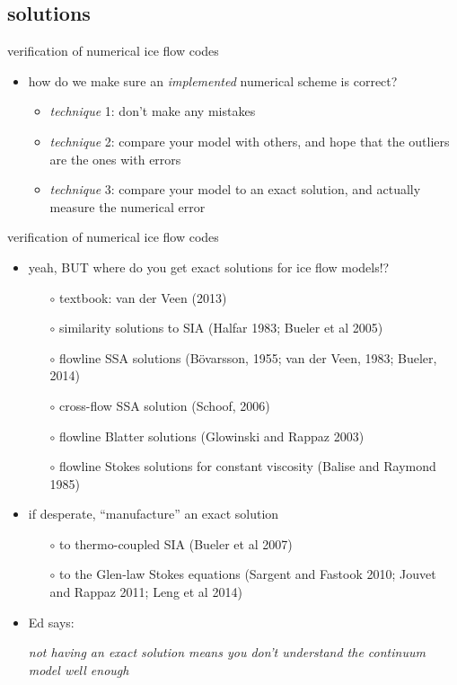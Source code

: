 \subsection{solutions}

\begin{frame}{verification of numerical ice flow codes}
\begin{itemize}
\item how do we make sure an \emph{implemented} numerical scheme is correct?
  \begin{itemize}
  \item<1->[$\circ$] \emph{technique} 1: don't make any mistakes
  \item<2->[$\circ$] \emph{technique} 2: compare your model with others, and hope that the outliers are the ones with errors 
  \item<3>[$\circ$] \emph{technique} 3: compare your model to an exact solution, and actually measure the numerical error 
  \end{itemize}
\end{itemize}
\end{frame}


\begin{frame}{verification of numerical ice flow codes }
\begin{itemize}
\item<1-> yeah, BUT where do you get exact solutions for ice flow models!?
  \begin{itemize}
  \item[$\circ$] textbook: van der Veen (2013)
  \item[$\circ$] similarity solutions to SIA (Halfar 1983; Bueler et al 2005)
  \item[$\circ$] flowline SSA solutions (B\"o\dh varsson, 1955; van der Veen, 1983; Bueler, 2014)
  \item[$\circ$] cross-flow SSA solution (Schoof, 2006)
  \item[$\circ$] flowline Blatter solutions (Glowinski and Rappaz 2003)
  \item[$\circ$] flowline Stokes solutions for constant viscosity (Balise and Raymond 1985)
  \end{itemize}

\item<2-> if desperate, ``manufacture'' an exact solution
  \begin{itemize}
  \item[$\circ$] to thermo-coupled SIA (Bueler et al 2007)
  \item[$\circ$] to the Glen-law Stokes equations (Sargent and Fastook 2010; Jouvet and Rappaz 2011; Leng et al 2014)
  \end{itemize}

\smallskip
\item<3> Ed says:
\begin{center}
\emph{not having an exact solution means you don't understand the continuum model well enough}
\end{center}
\end{itemize}
\end{frame}


